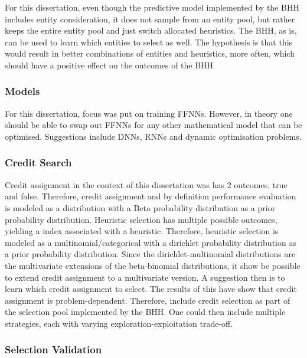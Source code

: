 For this dissertation, even though the predictive model implemented by the \ac{BHH} includes entity consideration, it does not sample from an entity pool, but rather keeps the entire entity pool and just switch allocated heuristics. The \ac{BHH}, as is, can be used to learn which entities to select as well. The hypothesis is that this would result in better combinations of entities and heuristics, more often, which should have a positive effect on the outcomes of the \ac{BHH}

\subsubsection{Models}

For this dissertation, focus was put on training \acp{FFNN}. However, in theory one should be able to swap out \acp{FFNN} for any other mathematical model that can be optimised. Suggestions include \acp{DNN}, \acp{RNN} and dynamic optimisation problems.

\subsubsection{Credit Search}

Credit assignment in the context of this dissertation was has 2 outcomes, true and false. Therefore, credit assignment and by definition performance evaluation is modeled as a  distribution with a Beta probability distribution as a prior probability distribution. Heuristic selection has multiple possible outcomes, yielding a index associated with a heuristic. Therefore, heuristic selection is modeled as a multinomial/categorical with a dirichlet probability distribution as a prior probability distribution. Since the dirichlet-multinomial distributions are the multivariate extensions of the beta-binomial distributions, it show be possible to extend credit assignment to a multivariate version. A suggestion then is to learn which credit assignment to select. The results of this have show that credit assignment is problem-dependent. Therefore, include credit selection as part of the selection pool implemented by the \ac{BHH}. One could then include multiple strategies, each with varying exploration-exploitation trade-off.

\subsubsection{Selection Validation}

